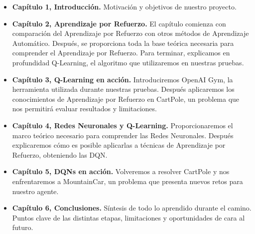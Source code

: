 \begin{itemize}
    \item \textbf{Capítulo 1, Introducción.} Motivación y objetivos de nuestro proyecto.
    \item \textbf{Capítulo 2, Aprendizaje por Refuerzo.} El capítulo comienza con comparación del Aprendizaje por Refuerzo con otros métodos de Aprendizaje Automático. Después, se proporciona toda la base teórica necesaria para comprender el Aprendizaje por Refuerzo. Para terminar, explicamos en profundidad Q-Learning, el algoritmo que utilizaremos en nuestras pruebas.
    \item \textbf{Capítulo 3, Q-Learning en acción.} Introduciremos OpenAI Gym, la herramienta utilizada durante nuestras pruebas. Después aplicaremos los conocimientos de Aprendizaje por Refuerzo en CartPole, un problema que nos permitirá evaluar resultados y limitaciones.
    \item \textbf{Capítulo 4, Redes Neuronales y Q-Learning.} Proporcionaremos el marco teórico necesario para comprender las Redes Neuronales. Después explicaremos cómo es posible aplicarlas a técnicas de Aprendizaje por Refuerzo, obteniendo las DQN.
    \item \textbf{Capítulo 5, DQNs en acción.} Volveremos a resolver CartPole y nos enfrentaremos a MountainCar, un problema que presenta nuevos retos para nuestro agente.
    \item \textbf{Capítulo 6, Conclusiones.} Síntesis de todo lo aprendido durante el camino. Puntos clave de las distintas etapas, limitaciones y oportunidades de cara al futuro.
    
\end{itemize}
